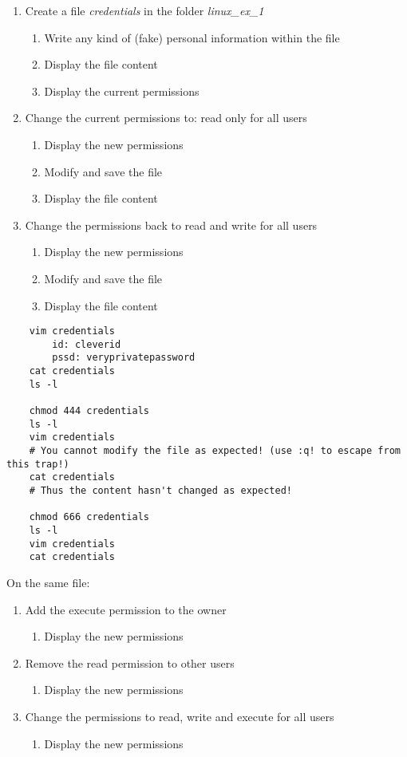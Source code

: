 \begin{enumerate}
    \item Create a file \textit{credentials} in the folder \textit{linux\_ex\_1}
    \begin{enumerate}
        \item Write any kind of (fake) personal information within the file
        \item Display the file content
        \item Display the current permissions
    \end{enumerate}
    \item Change the current permissions to: read only for all users
    \begin{enumerate}
        \item Display the new permissions
        \item Modify and save the file
        \item Display the file content
    \end{enumerate}
    \item Change the permissions back to read and write for all users
    \begin{enumerate}
        \item Display the new permissions
        \item Modify and save the file
        \item Display the file content
    \end{enumerate}
\end{enumerate}

\ifdefined\answer
\begin{verbatim}
    vim credentials
        id: cleverid
        pssd: veryprivatepassword
    cat credentials
    ls -l

    chmod 444 credentials
    ls -l
    vim credentials
    # You cannot modify the file as expected! (use :q! to escape from this trap!)
    cat credentials
    # Thus the content hasn't changed as expected!

    chmod 666 credentials
    ls -l
    vim credentials
    cat credentials
\end{verbatim}
\fi

\hfill \break
On the same file:
\begin{enumerate}
    \item Add the execute permission to the owner
    \begin{enumerate}
        \item Display the new permissions
    \end{enumerate}
    \item Remove the read permission to other users
    \begin{enumerate}
        \item Display the new permissions
    \end{enumerate}
    \item Change the permissions to read, write and execute for all users
    \begin{enumerate}
        \item Display the new permissions
    \end{enumerate}
\end{enumerate}

